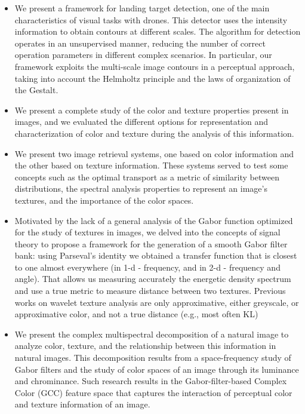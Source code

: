 \begin{itemize}
	\item We present a framework for landing target detection, one of the main characteristics of visual tasks with drones. This detector uses the intensity information to obtain contours at different scales. The algorithm for detection operates in an unsupervised manner, reducing the number of correct operation parameters in different complex scenarios. In particular, our framework exploits the multi-scale image contours in a perceptual approach, taking into account the Helmholtz principle and the laws of organization of the Gestalt.
	
	\item We present a complete study of the color and texture properties present in images, and we evaluated the different options for representation and characterization of color and texture during the analysis of this information.
	
	\item We present two image retrieval systems, one based on color information and the other based on texture information. These systems served to test some concepts such as the optimal transport as a metric of similarity between distributions, the spectral analysis properties to represent an image's textures, and the importance of the color spaces.
	
	\item Motivated by the lack of a general analysis of the Gabor function optimized for the study of textures in images, we delved into the concepts of signal theory to propose a framework for the generation of a smooth Gabor filter bank: using Parseval's identity we obtained a transfer function that is closest to one almost everywhere (in 1-d - frequency, and in 2-d - frequency and angle). That allows us measuring accurately the energetic density spectrum and use a true metric to measure distance between two textures. Previous works on wavelet texture analysis are only approximative, either greyscale, or approximative color, and not a true distance (e.g., most often KL)	
	
	\item We present the complex multispectral decomposition of a natural image to analyze color, texture, and the relationship between this information in natural images. This decomposition results from a space-frequency study of Gabor filters and the study of color spaces of an image through its luminance and chrominance. Such research results in the Gabor-filter-based Complex Color (GCC) feature space that captures the interaction of perceptual color and texture information of an image.
	

\end{itemize}
